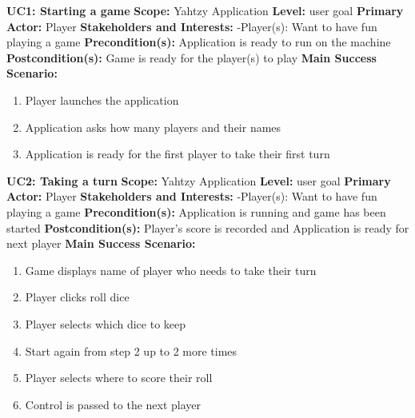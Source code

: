 \documentclass[12pt]{article}
\begin{document}
\newpage
\begin{list}{}{}

\item {\bf UC1: Starting a game } \newline
{\bf Scope:} Yahtzy Application \newline
{\bf Level:} user goal \newline
{\bf Primary Actor:} Player \newline
{\bf Stakeholders and Interests:} \newline
\indent -Player(s): Want to have fun playing a game \newline
{\bf Precondition(s):} Application is ready to run on the machine \newline
{\bf Postcondition(s):} Game is ready for the player(s) to play \newline \newline
{\bf Main Success Scenario:}
\begin{enumerate}
	\item Player launches the application
	\item Application asks how many players and their names
	\item Application is ready for the first player to take their first turn
\end{enumerate}

\vspace*{.3in}

\item {\bf UC2: Taking a turn} \newline
{\bf Scope:} Yahtzy Application \newline
{\bf Level:} user goal \newline
{\bf Primary Actor:} Player \newline
{\bf Stakeholders and Interests:} \newline
\indent -Player(s): Want to have fun playing a game \newline
\textbf{Precondition(s):} Application is running and game has been started \newline
\textbf{Postcondition(s):} Player’s score is recorded and Application is ready for next player \newline \newline
\textbf{Main Success Scenario:}
\begin{enumerate}
\item Game displays name of player who needs to take their turn
\item Player clicks roll dice
\item Player selects which dice to keep
\item Start again from step 2 up to 2 more times
\item Player selects where to score their roll
\item Control is passed to the next player
\end{enumerate}


\end{list}
\end{document}
